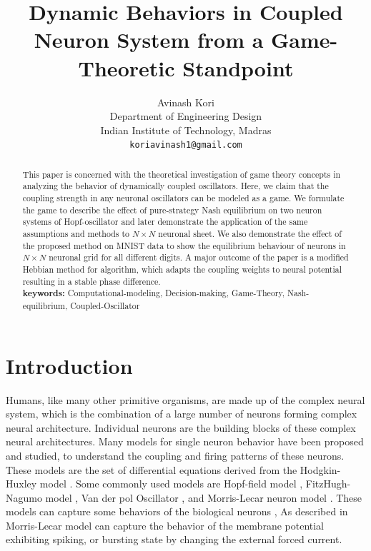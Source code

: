 \documentclass{article}
\title{Dynamic Behaviors in Coupled Neuron System from a Game-Theoretic Standpoint}
\author{%
  Avinash Kori\\
  Department of Engineering Design\\
  Indian Institute of Technology, Madras\\
  \texttt{koriavinash1@gmail.com} \\
}
\begin{document}
\maketitle

\begin{abstract}
This paper is concerned with the theoretical investigation of game theory concepts in analyzing the behavior of dynamically coupled oscillators. Here, we claim that the coupling strength in any neuronal oscillators can be modeled as a game. We formulate the game to describe the effect of pure-strategy Nash equilibrium on two neuron systems of Hopf-oscillator and later demonstrate the application of the same assumptions and methods to $N \times N$ neuronal sheet. We also demonstrate the effect of the proposed method on MNIST data to show the equilibrium behaviour of neurons in $N \times N$ neuronal grid for all different digits. A major outcome of the paper is a modified Hebbian method for algorithm, which adapts the coupling weights to neural potential resulting in a stable phase difference.
\\

\textbf{keywords: } {Computational-modeling, Decision-making, Game-Theory, Nash-equilibrium, Coupled-Oscillator}

\end{abstract}

\section{Introduction}
Humans, like many other primitive organisms, are made up of the complex neural system, which is the combination of a large number of neurons forming complex neural architecture. Individual neurons are the building blocks of these complex neural architectures. Many models for single neuron behavior have been proposed and studied, to understand the coupling and firing patterns of these neurons. These models are the set of differential equations derived from the Hodgkin-Huxley model \cite{hodgkin1952dual}. Some commonly used models are Hopf-field model \cite{wang2003hopf}, FitzHugh-Nagumo model \cite{fitzhugh1961impulses}, Van der pol Oscillator \cite{parlitz1987period}, and Morris-Lecar neuron model \cite{morris1981voltage}. These models can capture some behaviors of the biological neurons \cite{gu2001integer, koper1996experimental, gu2013experimental}, As described in \cite{tsumoto2006bifurcations} Morris-Lecar model can capture the behavior of the membrane potential exhibiting spiking, or bursting state by changing the external forced current. 
\end{document}
